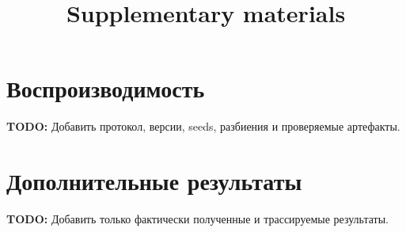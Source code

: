 \documentclass[12pt,a4paper]{article}
\title{Supplementary materials}
\author{}
\date{}
\newcommand{\ResultPending}[1]{\par\textbf{TODO:} #1\par}
\begin{document}
\maketitle
\section{Воспроизводимость}
\ResultPending{Добавить протокол, версии, seeds, разбиения и проверяемые артефакты.}
\section{Дополнительные результаты}
\ResultPending{Добавить только фактически полученные и трассируемые результаты.}
\end{document}
